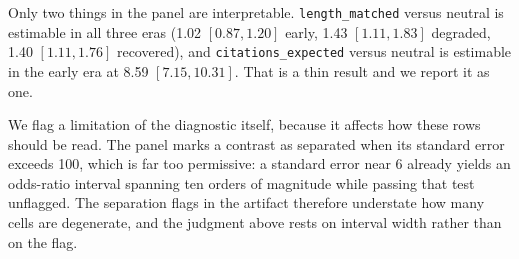 Only two things in the panel are interpretable. \texttt{length\_matched} versus
neutral is estimable in all three eras (1.02 $[0.87, 1.20]$ early, 1.43
$[1.11, 1.83]$ degraded, 1.40 $[1.11, 1.76]$ recovered), and
\texttt{citations\_expected} versus neutral is estimable in the early era at 8.59
$[7.15, 10.31]$. That is a thin result and we report it as one.

We flag a limitation of the diagnostic itself, because it affects how these rows
should be read. The panel marks a contrast as separated when its standard error
exceeds 100, which is far too permissive: a standard error near 6 already yields
an odds-ratio interval spanning ten orders of magnitude while passing that test
unflagged. The separation flags in the artifact therefore understate how many
cells are degenerate, and the judgment above rests on interval width rather than
on the flag.
